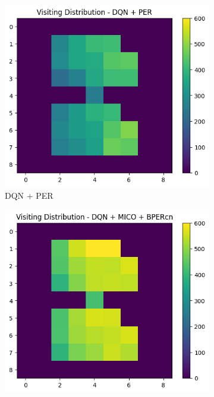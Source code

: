 \begin{figure}[H]
    \hspace*{\fill} %
    \vfill
    \begin{subfigure}{0.32\textwidth}
        \centering
        \includegraphics[width=\linewidth]{Results/grid_world/visitation_distribution_dqn_per.png}
        \caption{DQN + PER}
        \label{fig:visitation_distributions_per}
    \end{subfigure}
    \hfill
    \begin{subfigure}{0.32\textwidth}
        \centering
        \includegraphics[width=\linewidth]{Results/grid_world/visitation_distribution_dqn_mico_bpercn.png}

\end{subfigure}
\end{figure}
